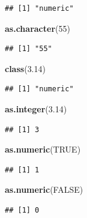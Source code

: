 \documentclass[]{book}
\newenvironment{Shaded}{\begin{snugshade}}{\end{snugshade}}
\newcommand{\KeywordTok}[1]{\textcolor[rgb]{0.13,0.29,0.53}{\textbf{#1}}}
\newcommand{\DecValTok}[1]{\textcolor[rgb]{0.00,0.00,0.81}{#1}}
\newcommand{\FloatTok}[1]{\textcolor[rgb]{0.00,0.00,0.81}{#1}}
\newcommand{\OtherTok}[1]{\textcolor[rgb]{0.56,0.35,0.01}{#1}}
\newcommand{\NormalTok}[1]{#1}
\begin{document}
\begin{verbatim}
## [1] "numeric"
\end{verbatim}

\begin{Shaded}
\begin{Highlighting}[]
\KeywordTok{as.character}\NormalTok{(}\DecValTok{55}\NormalTok{)}
\end{Highlighting}
\end{Shaded}

\begin{verbatim}
## [1] "55"
\end{verbatim}

\begin{Shaded}
\begin{Highlighting}[]
\KeywordTok{class}\NormalTok{(}\FloatTok{3.14}\NormalTok{)}
\end{Highlighting}
\end{Shaded}

\begin{verbatim}
## [1] "numeric"
\end{verbatim}

\begin{Shaded}
\begin{Highlighting}[]
\KeywordTok{as.integer}\NormalTok{(}\FloatTok{3.14}\NormalTok{)}
\end{Highlighting}
\end{Shaded}

\begin{verbatim}
## [1] 3
\end{verbatim}

\begin{Shaded}
\begin{Highlighting}[]
\KeywordTok{as.numeric}\NormalTok{(}\OtherTok{TRUE}\NormalTok{)}
\end{Highlighting}
\end{Shaded}

\begin{verbatim}
## [1] 1
\end{verbatim}

\begin{Shaded}
\begin{Highlighting}[]
\KeywordTok{as.numeric}\NormalTok{(}\OtherTok{FALSE}\NormalTok{)}
\end{Highlighting}
\end{Shaded}

\begin{verbatim}
## [1] 0
\end{verbatim}
\end{document}
